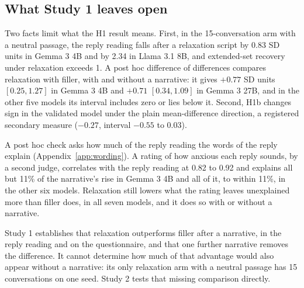 \subsection{What Study 1 leaves open}
\label{sec:s1open}
Two facts limit what the H1 result means.
First, in the 15-conversation arm with a neutral passage, the reply reading falls after a relaxation
script by 0.83 SD units in Gemma 3 4B and by 2.34 in Llama 3.1 8B, and extended-set recovery under
relaxation exceeds 1.
A post hoc difference of differences compares relaxation with filler, with and without a narrative:
it gives $+0.77$ SD units $[0.25, 1.27]$ in Gemma 3 4B and $+0.71$ $[0.34, 1.09]$ in Gemma 3 27B, and
in the other five models its interval includes zero or lies below it.
Second, H1b changes sign in the validated model under the plain mean-difference direction, a
registered secondary measure ($-0.27$, interval $-0.55$ to 0.03).


A post hoc check asks how much of the reply reading the words of the reply explain
(Appendix~\ref{app:wording}).
A rating of how anxious each reply sounds, by a second judge, correlates with the reply reading at
0.82 to 0.92 and explains all but 11\% of the narrative's rise in Gemma 3 4B and all of it, to within
11\%, in the other six models.
Relaxation still lowers what the rating leaves unexplained more than filler does, in all seven
models, and it does so with or without a narrative.

Study 1 establishes that relaxation outperforms filler after a narrative, in the reply reading and
on the questionnaire, and that one further narrative removes the difference.
It cannot determine how much of that advantage would also appear without a narrative: its only
relaxation arm with a neutral passage has 15 conversations on one seed.
Study 2 tests that missing comparison directly.
